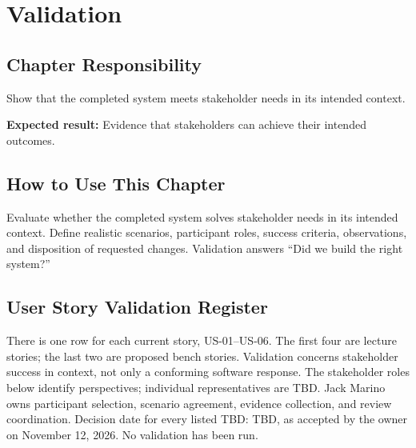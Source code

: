 \chapter{Validation}
\section{Chapter Responsibility}
\label{Section:ValidationResponsibility}
Show that the completed system meets stakeholder needs in its intended context.

\noindent\textbf{Expected result:} Evidence that stakeholders can achieve their intended outcomes.

\section{How to Use This Chapter}
Evaluate whether the completed system solves stakeholder needs in its intended context. Define realistic scenarios, participant roles, success criteria, observations, and disposition of requested changes.
Validation answers ``Did we build the right system?''

\section{User Story Validation Register}
\label{Section:ADCValidationPlans}
There is one row for each current story, US-01--US-06. The first four are
lecture stories; the last two are proposed bench stories. Validation concerns
stakeholder success in context, not only a conforming software response.
The stakeholder roles below identify perspectives; individual representatives
are TBD. Jack Marino owns participant selection, scenario agreement, evidence
collection, and review coordination. Decision date for every listed TBD: TBD,
as accepted by the owner on November 12, 2026. No validation has been run.


